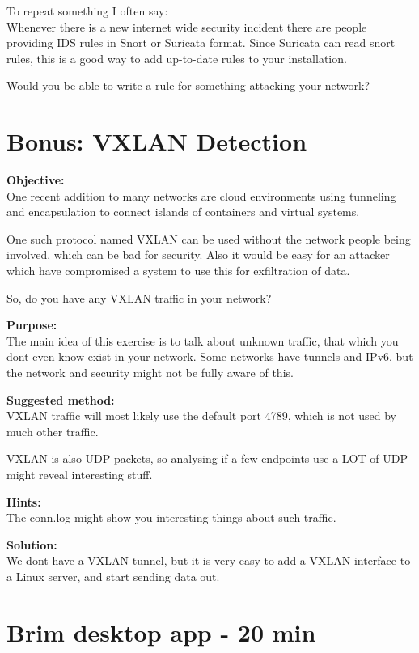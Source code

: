 \documentclass[a4paper,11pt,notitlepage]{report}
\begin{document}
To repeat something I often say:\\
Whenever there is a new internet wide security incident there are people providing IDS rules in Snort or Suricata format. Since Suricata can read snort rules, this is a good way to add up-to-date rules to your installation.

Would you be able to write a rule for something attacking your network?


\chapter{Bonus: VXLAN Detection}
\label{ex:vxlandetect}


{\bf Objective:} \\
One recent addition to many networks are cloud environments using tunneling and encapsulation to connect islands of containers and virtual systems.

One such protocol named VXLAN can be used without the network people being involved, which can be bad for security. Also it would be easy for an attacker which have compromised a system to use this for exfiltration of data.

So, do you have any VXLAN traffic in your network?


{\bf Purpose:}\\
The main idea of this exercise is to talk about unknown traffic, that which you dont even know exist in your network. Some networks have tunnels and IPv6, but the network and security might not be fully aware of this.


{\bf Suggested method:}\\
VXLAN traffic will most likely use the default port 4789, which is not used by much other traffic.

VXLAN is also UDP packets, so analysing if a few endpoints use a LOT of UDP might reveal interesting stuff.


{\bf Hints:}\\
The conn.log might show you interesting things about such traffic.


{\bf Solution:}\\
We dont have a VXLAN tunnel, but it is very easy to add a VXLAN interface to a Linux server, and start sending data out.






\chapter{Brim desktop app -  20 min}
\label{ex:brim-security}
\end{document}
